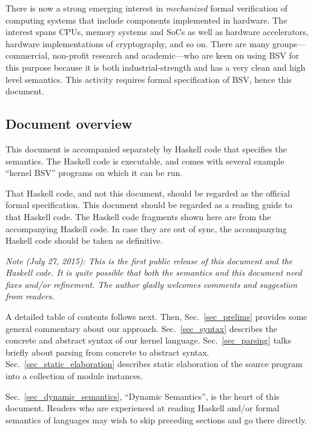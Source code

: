 \documentclass[11pt]{article}
\begin{document}
There is now a strong emerging interest in \emph{mechanized} formal
verification of computing systems that include components implemented
in hardware.  The interest spans CPUs, memory systems and SoCs as well
as hardware accelerators, hardware implementations of cryptography,
and so on.  There are many groups---commercial, non-profit research
and academic---who are keen on using BSV for this purpose because it
is both industrial-strength and has a very clean and high level
semantics.  This activity requires formal specification of BSV, hence
this document.


\subsection{Document overview}

This document is accompanied separately by Haskell code that specifies
the semantics.  The Haskell code is executable, and comes with several
example ``kernel BSV'' programs on which it can be run.

That Haskell code, and not this document, should be regarded as the
official formal specification.  This document should be regarded as a
reading guide to that Haskell code.  The Haskell code fragments shown
here are from the accompanying Haskell code.  In case they are out of
sync, the accompanying Haskell code should be taken as definitive.

\emph{Note (July 27, 2015): This is the first public release of this
document and the Haskell code.  It is quite possible that both the
semantics and this document need fixes and/or refinement.  The author
gladly welcomes comments and suggestion from readers.}

A detailed table of contents follows next.  Then,
Sec.~\ref{sec_prelims} provides some general commentary about our
approach.  Sec.~\ref{sec_syntax} describes the concrete and abstract
syntax of our kernel language.  Sec.~\ref{sec_parsing} talks briefly
about parsing from concrete to abstract syntax.
Sec.~\ref{sec_static_elaboration} describes static elaboration of the
source program into a collection of module instances.

Sec.~\ref{sec_dynamic_semantics}, ``Dynamic Semantics'', is the heart
of this document.  Readers who are experienced at reading Haskell
and/or formal semantics of languages may wish to skip preceding
sections and go there directly.
\end{document}
